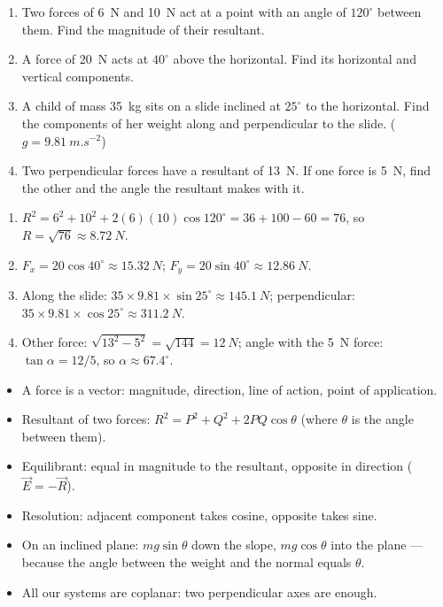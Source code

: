 \documentclass[11pt]{article}
\begin{document}
\begin{exercice}[Practice]
\begin{enumerate}
\item Two forces of \SI{6}{N} and \SI{10}{N} act at a point with an angle of $120^\circ$ between them. Find the magnitude of their resultant.
\item A force of \SI{20}{N} acts at $40^\circ$ above the horizontal. Find its horizontal and vertical components.
\item A child of mass \SI{35}{kg} sits on a slide inclined at $25^\circ$ to the horizontal. Find the components of her weight along and perpendicular to the slide. ($g = \SI{9.81}{m.s^{-2}}$)
\item Two perpendicular forces have a resultant of \SI{13}{N}. If one force is \SI{5}{N}, find the other and the angle the resultant makes with it.
\end{enumerate}
\end{exercice}

\begin{corrige}[Exercise 1]
\begin{enumerate}
\item $R^2 = 6^2 + 10^2 + 2(6)(10)\cos 120^\circ = 36 + 100 - 60 = 76$, so $R = \sqrt{76} \approx \SI{8.72}{N}$.
\item $F_x = 20\cos 40^\circ \approx \SI{15.32}{N}$; $F_y = 20\sin 40^\circ \approx \SI{12.86}{N}$.
\item Along the slide: $35 \times 9.81 \times \sin 25^\circ \approx \SI{145.1}{N}$; perpendicular: $35 \times 9.81 \times \cos 25^\circ \approx \SI{311.2}{N}$.
\item Other force: $\sqrt{13^2 - 5^2} = \sqrt{144} = \SI{12}{N}$; angle with the \SI{5}{N} force: $\tan\alpha = 12/5$, so $\alpha \approx 67.4^\circ$.
\end{enumerate}
\end{corrige}

\begin{aretenir}[To remember]
\begin{itemize}
\item A force is a vector: magnitude, direction, line of action, point of application.
\item Resultant of two forces: $R^2 = P^2 + Q^2 + 2PQ\cos\theta$ (where $\theta$ is the angle between them).
\item Equilibrant: equal in magnitude to the resultant, opposite in direction ($\vec{E}=-\vec{R}$).
\item Resolution: adjacent component takes cosine, opposite takes sine.
\item On an inclined plane: $mg\sin\theta$ down the slope, $mg\cos\theta$ into the plane --- because the angle between the weight and the normal equals $\theta$.
\item All our systems are coplanar: two perpendicular axes are enough.
\end{itemize}
\end{aretenir}
\end{document}
